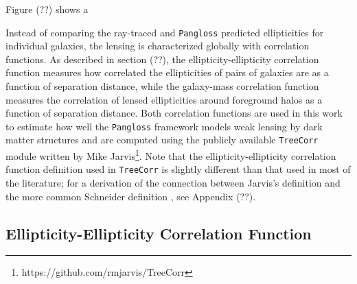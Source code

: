 \documentclass[%
 reprint,
 amsmath,amssymb,
 aps,nofootinbib
]{revtex4-1}
\begin{document}
Figure (??) shows a 

Instead of comparing the ray-traced and \texttt{Pangloss} predicted ellipticities for individual galaxies, the lensing is characterized globally with correlation functions. As described in section (??), the ellipticity-ellipticity correlation function measures how correlated the ellipticities of pairs of galaxies are as a function of separation distance, while the galaxy-mass correlation function measures the correlation of lensed ellipticities around foreground halos as a function of separation distance. Both correlation functions are used in this work to estimate how well the \texttt{Pangloss} framework models weak lensing by dark matter structures and are computed using the publicly available \texttt{TreeCorr} module written by Mike Jarvis\footnote{https://github.com/rmjarvis/TreeCorr}. Note that the ellipticity-ellipticity correlation function definition used in \texttt{TreeCorr} is slightly different than that used in most of the literature; for a derivation of the connection between Jarvis's definition and the more common Schneider definition \cite{schneider}, see Appendix (??).



\subsection{Ellipticity-Ellipticity Correlation Function}
\end{document}
